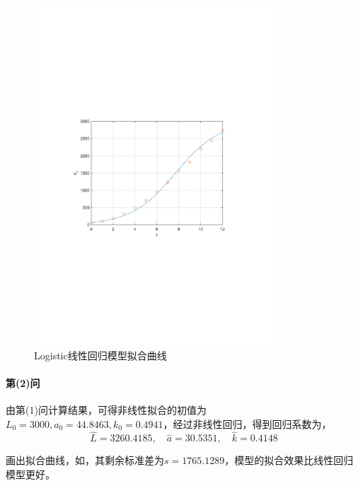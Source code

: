 \begin{figure}[H]
    \centering
    \includegraphics[width=0.8\textwidth,trim={3.09cm 9.295cm 3.09cm 9.295cm},clip]{fig/ex13_logistic_linear.pdf}
    \caption{Logistic线性回归模型拟合曲线}
    \label{fig:ex13_logistic_linear}
\end{figure}

\paragraph{第(2)问} 由第(1)问计算结果，可得非线性拟合的初值为$L_0 = 3000, a_0 = 44.8463, k_0 = 0.4941$，经过非线性回归，得到回归系数为，
\begin{equation}
    \hat{L} = 3260.4185, \quad \hat{a} = 30.5351, \quad \hat{k} = 0.4148
\end{equation}

画出拟合曲线，如，其剩余标准差为$s=1765.1289$，模型的拟合效果比线性回归模型更好。


